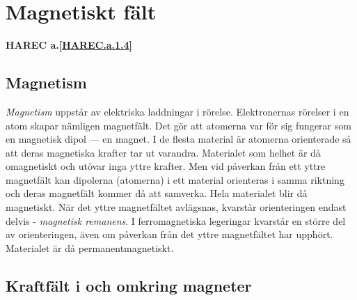 \section{Magnetiskt fält}
\textbf{HAREC a.\ref{HAREC.a.1.4}\label{myHAREC.a.1.4}}
\label{elektromagnetiskafält}

\subsection{Magnetism}


\emph{Magnetism} uppstår av elektriska laddningar i rörelse. Elektronernas rörelser i
en atom skapar nämligen magnetfält. Det gör att atomerna var för sig fungerar
som en magnetisk dipol --- en magnet. I de flesta material är atomerna
orienterade så att deras magnetiska krafter tar ut varandra. Materialet som
helhet är då omagnetiskt och utövar inga yttre krafter. Men vid påverkan från
ett yttre magnetfält kan dipolerna (atomerna) i ett material orienteras i samma
riktning och deras magnetfält kommer då att samverka. Hela materialet blir då
magnetiskt. När det yttre magnetfältet avlägsnas, kvarstår orienteringen endast
delvis - \emph{magnetisk remanens}. I ferromagnetiska legeringar kvarstår en
större del av orienteringen, även om påverkan från det yttre magnetfältet har
upphört. Materialet är då permanentmagnetiskt.

\subsection{Kraftfält i och omkring magneter}

